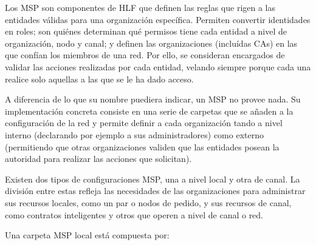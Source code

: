 Los MSP son componentes de HLF que definen las reglas que rigen a las entidades v\'alidas para una organizaci\'on espec\'ifica. Permiten convertir identidades en roles; son qui\'enes determinan qu\'e permisos tiene cada entidad a nivel de organizaci\'on, nodo y canal; y definen las organizaciones (inclu\'idas CAs) en las que conf\'ian los miembros de una red. Por ello, se consideran encargados de validar las acciones realizadas por cada entidad, velando siempre porque cada una realice solo aquellas a las que se le ha dado acceso.

A diferencia de lo que su nombre puediera indicar, un MSP no provee nada. Su implementaci\'on concreta consiste en una serie de carpetas que se a\~naden a la configuraci\'on de la red y permite definir a cada organizaci\'on tando a nivel interno (declarando por ejemplo a sus administradores) como externo (permitiendo que otras organizaciones validen que las entidades posean la autoridad para realizar las acciones que solicitan).

Existen dos tipos de configuraciones MSP, una a nivel local y otra de canal. La divisi\'on entre estas refleja las necesidades de las organizaciones para administrar sus recursos locales, como un par o nodos de pedido, y sus recursos de canal, como contratos inteligentes y otros que operen a nivel de canal o red.

Una carpeta MSP local est\'a compuesta por:

